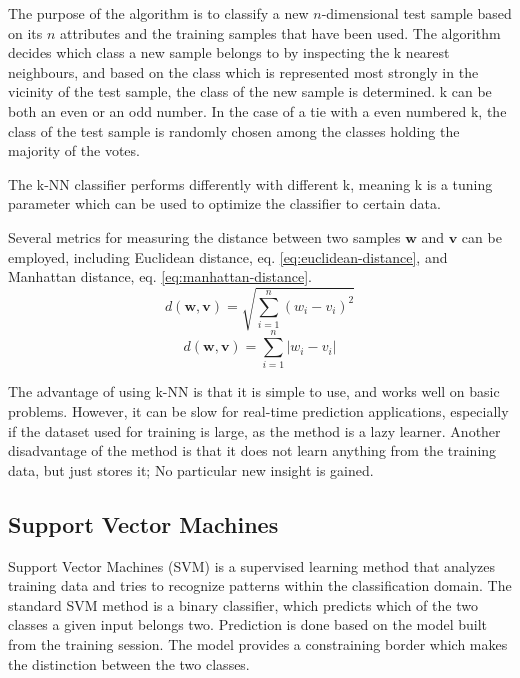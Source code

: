The purpose of the algorithm is to classify a
new \(n\)-dimensional test sample based on its \(n\) attributes
and the training samples that have been used.
The algorithm decides which class a new sample belongs to by
inspecting the k nearest neighbours,
and based on the class which is represented most strongly in the vicinity
of the test sample,
the class of the new sample is determined.
k can be both an even or an odd number.
In the case of a tie with a even numbered k,
the class of the test sample is randomly chosen among the classes holding
the majority of the votes.

The k-NN classifier performs differently with different k,
meaning k is a tuning parameter which can be used to optimize the classifier
to certain data.

Several metrics for measuring the distance between
two samples \(\mathbf{w}\) and \(\mathbf{v}\) can be employed,
including Euclidean distance, eq. \eqref{eq:euclidean-distance},
and Manhattan distance, eq. \eqref{eq:manhattan-distance}.
\begin{equation}
d(\mathbf{w},\mathbf{v}) = \sqrt{\sum_{i=1}^n (w_i - v_i)^2}
\label{eq:euclidean-distance}
\end{equation}
\begin{equation}
d(\mathbf{w},\mathbf{v}) = \sum_{i=1}^n \left|w_i - v_i\right|
\label{eq:manhattan-distance}
\end{equation}

The advantage of using k-NN is that it is simple to use,
and works well on basic problems.
However, it can be slow for real-time prediction applications,
especially if the dataset used for training is large,
as the method is a lazy learner.
Another disadvantage of the method is that it does not
learn anything from the training data, but just stores it;
No particular new insight is gained.
 
\subsection{Support Vector Machines}
Support Vector Machines (SVM) is a supervised learning
method that analyzes training data 
and tries to recognize patterns within the classification domain.
The standard SVM method is a binary classifier,
which predicts which of the two classes a given input belongs two. 
Prediction is done based on the model built from the training session.
The model provides a constraining border which makes the distinction
between the two classes.

